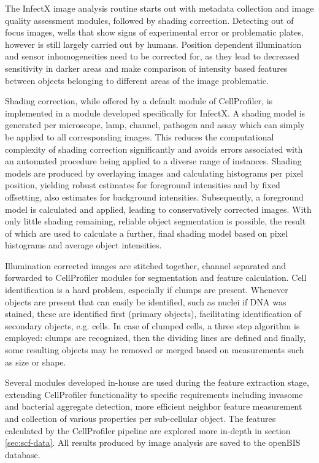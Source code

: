 The InfectX image analysis routine starts out with metadata collection and image quality assessment modules, followed by shading correction. Detecting out of focus images, wells that show signs of experimental error or problematic plates, however is still largely carried out by humans. Position dependent illumination and sensor inhomogeneities need to be corrected for, as they lead to decreased sensitivity in darker areas and make comparison of intensity based features between objects belonging to different areas of the image problematic.

Shading correction, while offered by a default module of CellProfiler, is implemented in a module developed specifically for InfectX. A shading model is generated per microscope, lamp, channel, pathogen and assay which can simply be applied to all corresponding images. This reduces the computational complexity of shading correction significantly and avoids errors associated with an automated procedure being applied to a diverse range of instances. Shading models are produced by overlaying images and calculating histograms per pixel position, yielding robust estimates for foreground intensities and by fixed offsetting, also estimates for background intensities. Subsequently, a foreground model is calculated and applied, leading to conservatively corrected images. With only little shading remaining, reliable object segmentation is possible, the result of which are used to calculate a further, final shading model based on pixel histograms and average object intensities.

Illumination corrected images are stitched together, channel separated and forwarded to CellProfiler modules for segmentation and feature calculation. Cell identification is a hard problem, especially if clumps are present. Whenever objects are present that can easily be identified, such as nuclei if DNA was stained, these are identified first (primary objects), facilitating identification of secondary objects, e.g. cells. In case of clumped cells, a three step algorithm is employed: clumps are recognized, then the dividing lines are defined and finally, some resulting objects may be removed or merged based on measurements such as size or shape.

Several modules developed in-house are used during the feature extraction stage, extending CellProfiler functionality to specific requirements including invasome and bacterial aggregate detection, more efficient neighbor feature measurement and collection of various properties per sub-cellular object. The features calculated by the CellProfiler pipeline are explored more in-depth in section \ref{sec:scf-data}. All results produced by image analysis are saved to the openBIS database.

